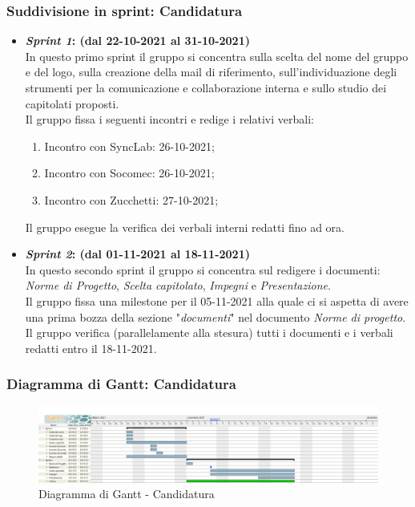 \subsubsection{Suddivisione in sprint: Candidatura}
\begin{itemize}
    \item \textbf{\textit{Sprint 1}: (dal 22-10-2021 al 31-10-2021)}\\
    In questo primo sprint il gruppo si concentra sulla scelta del nome del gruppo e del logo, sulla creazione della mail di riferimento, sull'individuazione degli strumenti per la comunicazione e collaborazione interna e sullo studio dei capitolati proposti.\\
    Il gruppo fissa i seguenti incontri e redige i relativi verbali:
    \begin{enumerate}
        \item Incontro con SyncLab: 26-10-2021;
        \item Incontro con Socomec: 26-10-2021;
        \item Incontro con Zucchetti: 27-10-2021; 
    \end{enumerate}
    Il gruppo esegue la verifica dei verbali interni redatti fino ad ora.

    \item \textbf{\textit{Sprint 2}: (dal 01-11-2021 al 18-11-2021)}\\
    In questo secondo sprint il gruppo si concentra sul redigere i documenti: \textit{Norme di Progetto}, \textit{Scelta capitolato}, \textit{Impegni} e \textit{Presentazione}.
    \\Il gruppo fissa una milestone per il 05-11-2021 alla quale ci si aspetta di avere una prima bozza della sezione "\textit{documenti}" nel documento \textit{Norme di progetto}. \\
    Il gruppo verifica (parallelamente alla stesura) tutti i documenti e i verbali redatti entro il 18-11-2021.
\end{itemize}

\subsubsection{Diagramma di Gantt: Candidatura}
\begin{figure}[h!]
    \centering
    \includegraphics[scale=0.22]{../../assets/Diagrammi_Gantt/Candidatura.png}
    \caption{Diagramma di Gantt - Candidatura}
\end{figure}

